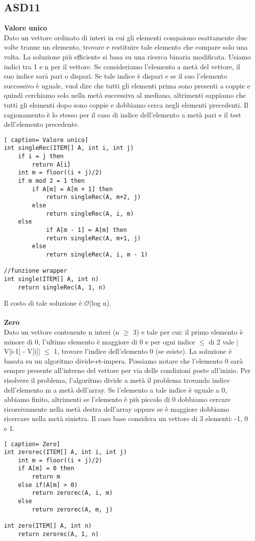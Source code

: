 \documentclass[../cheatSheetAlgoritmi.tex]{subfiles}
\begin{document}
\subsection{ASD11}
\textbf{Valore unico}\\
Dato un vettore ordinato di interi in cui gli elementi compaiono esattamente due volte tranne un elemento, trovare e restituire tale elemento che compare solo una volta. La soluzione più efficiente si basa su una ricerca binaria modificata. Usiamo indici tra 1 e n per il vettore. Se consideriamo l'elemento a metà del vettore, il suo indice sarà pari o dispari. Se tale indice è dispari e se il suo l'elemento successivo è uguale, vuol dire che tutti gli elementi prima sono presenti a coppie e quindi cerchiamo solo nella  metà successiva al mediano, altrimenti sappiamo che tutti gli elementi dopo sono coppie e dobbiamo cerca negli elementi precedenti. Il ragionamento è lo stesso per il caso di indice dell'elemento a metà pari e il test dell'elemento precedente.
\newpage
\begin{lstlisting}[ caption= Valore unico]
int singleRec(ITEM[] A, int i, int j)
	if i = j then
		return A[i]
	int m = floor((i + j)/2)
	if m mod 2 = 1 then
		if A[m] = A[m + 1] then
			return singleRec(A, m+2, j)
		else
			return singleRec(A, i, m)
	else
			if A[m - 1] = A[m] then
			return singleRec(A, m+1, j)
		else
			return singleRec(A, i, m - 1)
			
//funzione wrapper
int single(ITEM[] A, int n)
	return singleRec(A, 1, n)
\end{lstlisting}
Il costo di tale soluzione è $\mathcal{O}$(log n).\\\\
\textbf{Zero}\\
Dato un vettore contenente n interi (n $\geq$ 3) e tale per cui: il primo elemento è minore di 0, l'ultimo elemento è maggiore di 0 e per ogni indice $\leq$ di 2 vale | V[i-1] - V[i]| $\leq$ 1, trovare l'indice dell'elemento 0 (se esiste). La soluzione è basata su un algoritmo divide-et-impera. Possiamo notare che l'elemento 0 sarà sempre presente all'interno del vettore per via delle condizioni poste all'inizio. Per risolvere il problema, l'algoritmo divide a metà il problema trovando indice dell'elemento m a metà dell'array. Se l'elemento a tale indice è uguale a 0, abbiamo finito, altrimenti se l'elemento è più piccolo di 0 dobbiamo cercare ricorsivamente nella metà destra dell'array oppure se è maggiore dobbiamo ricercare nella metà sinistra. Il caso base considera un vettore di 3 elementi: -1, 0 e 1.
 
\begin{lstlisting}[ caption= Zero]
int zerorec(ITEM[] A, int i, int j)
	int m = floor((i + j)/2)
	if A[m] = 0 then
		return m
	else if(A[m] > 0)
		return zerorec(A, i, m)
	else
		return zerorec(A, m, j)
			
int zero(ITEM[] A, int n)
	return zerorec(A, 1, n)
\end{lstlisting}

\newpage
\end{document}
